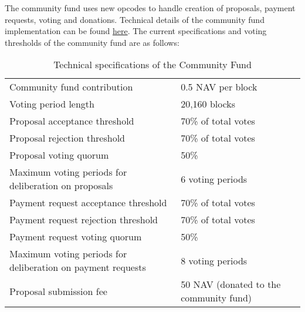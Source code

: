 The community fund uses new opcodes to handle creation of proposals, payment requests, voting and donations. Technical 
details of the community fund implementation can be found 
\href{https://github.com/aguycalled/cfundpaper/blob/master/cfund.pdf}{here}. The current specifications and 
voting thresholds of the community fund are as follows:
\begin{table}[h]
\centering
\begin{tabular}{l l}
\hline
Community fund contribution & 0.5 NAV per block \\
Voting period length & 20,160 blocks\\
Proposal acceptance threshold & 70\% of total votes \\
Proposal rejection threshold & 70\% of total votes \\
Proposal voting quorum & 50\% \\
Maximum voting periods for deliberation on proposals & 6 voting periods \\
Payment request acceptance threshold & 70\% of total votes \\
Payment request rejection threshold & 70\% of total votes \\
Payment request voting quorum & 50\% \\
Maximum voting periods for deliberation on payment requests & 8 voting periods \\
Proposal submission fee & 50 NAV (donated to the community fund) \\
\hline
\end{tabular}
\caption{Technical specifications of the Community Fund}
\end{table}

